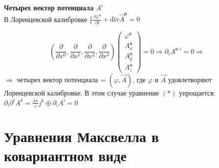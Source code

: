 \documentclass[12pt, a4paper]{report}
\begin{document}
\textbf{Четырех вектор потенциала \( A^i \)} \\

В Лоренцевской калибровке \( \displaystyle  \frac{1}{c }  \frac{\partial  \varphi ^{\text{н} } }{\partial  t } + \mathrm{div }  \vec{A } ^{\text{н} } = 0   \) 

\[ \left( \frac{\partial  }{ \partial  x ^0 }, \frac{\partial}{ \partial  x ^1 } , \frac{\partial  }{\partial  x^2 } , \frac{\partial  }{\partial  x^3 }     \right) 
\begin{pmatrix}
\varphi^{\text{н} }\\
A_x ^{\text{н} }\\
A_y^{\text{н} }\\
A_z ^{\text{н} }
\end{pmatrix} = 0 \Rightarrow \partial _i A ^{\text{н } i } = 0 \Rightarrow \] 
\( \Rightarrow \) четырех вектор потенциала = \( (\varphi , \vec{A } ) \), где \( \varphi  \) и \( \vec{ A }  \) удовлетворяют Лоренцевской калибровке. В этом случае уравнение \( (*) \) упрощается: \( \displaystyle  \partial _i \partial ^i A^k = \frac{4 \pi }{c } j^k \oplus \partial _i A^i =0  \) 

\section{Уравнения Максвелла в ковариантном виде}
\end{document}

